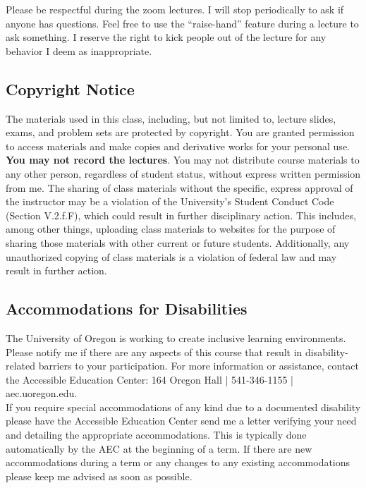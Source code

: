 \documentclass[11pt]{article}
\begin{document}
Please be respectful during the zoom lectures.  I will stop periodically to ask if anyone has questions. Feel free to use the ``raise-hand'' feature during a lecture to ask something. I reserve the right to kick people out of the lecture for any behavior I deem as inappropriate.  
	
	\subsection*{Copyright Notice}
	
The materials used in this class, including, but not limited to, lecture slides, exams, and problem sets are protected by copyright. You are granted permission to access materials and make copies and derivative works for your personal use. \textbf{You may not record the lectures}. You may not distribute course materials to any other person, regardless of student status, without express written permission from me. The sharing of class materials without the specific, express approval of the instructor may be a violation of the University’s Student Conduct Code (Section V.2.f.F), which could result in further disciplinary action. This includes, among other things, uploading class materials to websites for the purpose of sharing those materials with other current or future students. Additionally, any unauthorized copying of class materials is a violation of federal law and may result in further action.

	
	\subsection*{Accommodations for Disabilities}
	
	The University of Oregon is working to create inclusive learning environments. Please notify me if there are any aspects of this course that result in disability-related barriers to your participation. For more information or assistance, contact the Accessible Education Center: 164 Oregon Hall | 541-346-1155 | aec.uoregon.edu.\\
	
	If you require special accommodations of any kind due to a documented disability please have the Accessible Education Center send me a letter verifying your need and detailing the appropriate accommodations. This is typically done automatically by the AEC at the beginning of a term. If there are new accommodations during a term or any changes to any existing accommodations please keep me advised as soon as possible.\\
	
\end{document}
